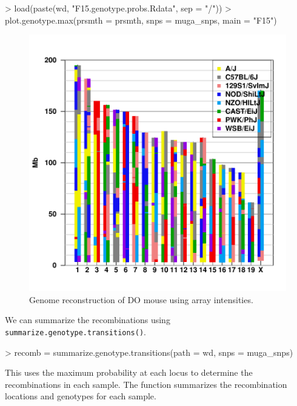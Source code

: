 \documentclass{article}
\begin{document}
\begin{Schunk}
\begin{Sinput}
> load(paste(wd, "F15.genotype.probs.Rdata", sep = "/"))
> plot.genotype.max(prsmth = prsmth, snps = muga_snps, main = "F15")
\end{Sinput}
\end{Schunk}

\begin{figure}
\begin{center}
\includegraphics{Genotyping_DO_Mice-fig2}
\end{center}
\caption{Genome reconstruction of DO mouse using array intensities. }
\label{fig:intensity_genoplot}
\end{figure}

We can summarize the recombinations using \texttt{summarize.genotype.transitions()}. 

\begin{Schunk}
\begin{Sinput}
> recomb = summarize.genotype.transitions(path = wd, snps = muga_snps)
\end{Sinput}
\end{Schunk}

This uses the maximum probability at each locus to determine the recombinations in each sample. The function summarizes the recombination locations and genotypes for each sample.
\end{document}
